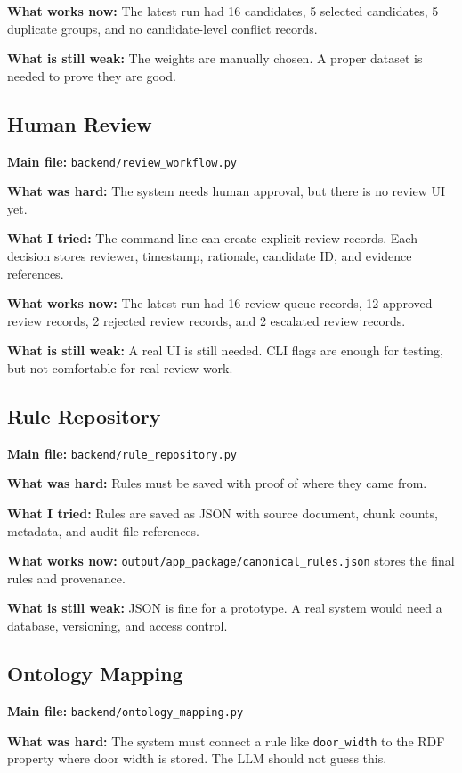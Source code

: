 \documentclass[11pt,a4paper]{article}
\begin{document}
\textbf{What works now:}
The latest run had 16 candidates, 5 selected candidates, 5 duplicate groups, and no candidate-level conflict records.

\textbf{What is still weak:}
The weights are manually chosen. A proper dataset is needed to prove they are good.

\subsection{Human Review}
\textbf{Main file:} \texttt{backend/review\_workflow.py}

\textbf{What was hard:}
The system needs human approval, but there is no review UI yet.

\textbf{What I tried:}
The command line can create explicit review records. Each decision stores reviewer, timestamp, rationale, candidate ID, and evidence references.

\textbf{What works now:}
The latest run had 16 review queue records, 12 approved review records, 2 rejected review records, and 2 escalated review records.

\textbf{What is still weak:}
A real UI is still needed. CLI flags are enough for testing, but not comfortable for real review work.

\subsection{Rule Repository}
\textbf{Main file:} \texttt{backend/rule\_repository.py}

\textbf{What was hard:}
Rules must be saved with proof of where they came from.

\textbf{What I tried:}
Rules are saved as JSON with source document, chunk counts, metadata, and audit file references.

\textbf{What works now:}
\texttt{output/app\_package/canonical\_rules.json} stores the final rules and provenance.

\textbf{What is still weak:}
JSON is fine for a prototype. A real system would need a database, versioning, and access control.

\subsection{Ontology Mapping}
\textbf{Main file:} \texttt{backend/ontology\_mapping.py}

\textbf{What was hard:}
The system must connect a rule like \texttt{door\_width} to the RDF property where door width is stored. The LLM should not guess this.
\end{document}
